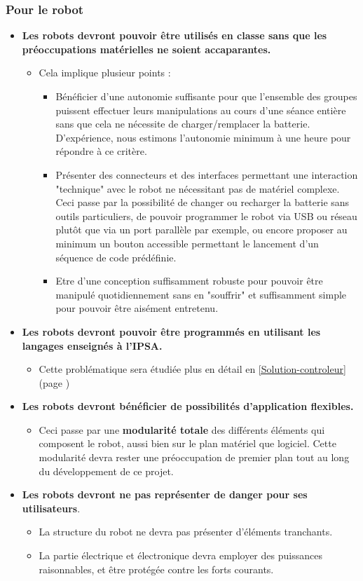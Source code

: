 	\subsubsection{Pour le robot}
		\begin{itemize}
			\item \textbf{Les robots devront pouvoir être utilisés en classe sans que les préoccupations matérielles ne soient accaparantes.}
			\begin{itemize}
				\item Cela implique plusieur points :
				\begin{itemize}
					\item Bénéficier d'une autonomie suffisante pour que l'ensemble des groupes puissent effectuer leurs manipulations au cours d'une séance entière sans que cela ne nécessite de charger/remplacer la batterie. D'expérience, nous estimons l'autonomie minimum à une heure pour répondre à ce critère.
					\item Présenter des connecteurs et des interfaces permettant une interaction "technique" avec le robot ne nécessitant pas de matériel complexe. Ceci passe par la possibilité de changer ou recharger la batterie sans outils particuliers, de pouvoir programmer le robot via USB ou réseau plutôt que via un port parallèle par exemple, ou encore proposer au minimum un bouton accessible permettant le lancement d'un séquence de code prédéfinie.
					\item Etre d'une conception suffisamment robuste pour pouvoir être manipulé quotidiennement sans en "souffrir" et suffisamment simple pour pouvoir être aisément entretenu.
				\end{itemize} 
			\end{itemize}
			\item \textbf{Les robots devront pouvoir être programmés en utilisant les langages enseignés à l'IPSA.}
			\begin{itemize}
				\item Cette problématique sera étudiée plus en détail en \ref{Solution-controleur} (page \pageref{Solution-controleur})
			\end{itemize}
			\item \textbf{Les robots devront bénéficier de possibilités d'application flexibles.}
			\begin{itemize}
				\item Ceci passe par une \textbf{modularité totale} des différents éléments qui composent le robot, aussi bien sur le plan matériel que logiciel. Cette modularité devra rester une préoccupation de premier plan tout au long du développement de ce projet.
			\end{itemize}
			\item \textbf{Les robots devront ne pas représenter de danger pour ses utilisateurs}.
			\begin{itemize}
				\item La structure du robot ne devra pas présenter d'éléments tranchants.
				\item La partie électrique et électronique devra employer des puissances raisonnables, et être protégée contre les forts courants.
			\end{itemize}
		\end{itemize}


